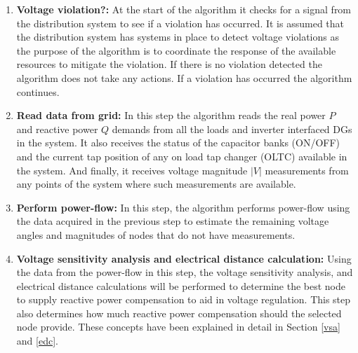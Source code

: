 \begin{enumerate}
    \item \textbf{Voltage violation?:} At the start of the algorithm it checks for a signal from the distribution system to see if a violation has occurred. It is assumed that the distribution system has systems in place to detect voltage violations as the purpose of the algorithm is to coordinate the response of the available resources to mitigate the violation. If there is no violation detected the algorithm does not take any actions. If a violation has occurred the algorithm continues.
    
    \item \textbf{Read data from grid:} In this step the algorithm reads the real power $P$ and reactive power $Q$ demands from all the loads and inverter interfaced DGs in the system. It also receives the status of the capacitor banks (ON/OFF) and the current tap position of any on load tap changer (OLTC) available in the system. And finally, it receives voltage magnitude $|V|$ measurements from any points of the system where such measurements are available.
    
    \item \textbf{Perform power-flow:} In this step, the algorithm performs power-flow using the data acquired in the previous step to estimate the remaining voltage angles and magnitudes of nodes that do not have measurements. 
    
    \item \textbf{Voltage sensitivity analysis and electrical distance calculation:} Using the data from the power-flow in this step, the voltage sensitivity analysis, and electrical distance calculations will be performed to determine the best node to supply reactive power compensation to aid in voltage regulation. This step also determines how much reactive power compensation should the selected node provide. These concepts have been explained in detail in Section \ref{vsa} and \ref{edc}.
    

\end{enumerate}
